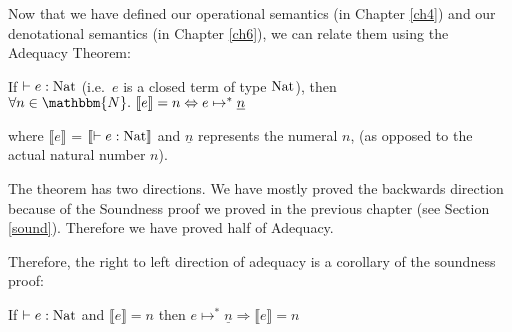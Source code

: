 Now that we have defined our operational semantics (in  Chapter \ref{ch4}) and our denotational semantics (in Chapter \ref{ch6}), we can relate them using the Adequacy Theorem: 

\vspace{1cm}
\begin{thm}\label{adeq}
If $\vdash e : \operatorname{Nat}$ (i.e.\ $e$ is a closed term of type $\operatorname{Nat}$), then $\forall n \in \mathbbm{N}. \ \llbracket e \rrbracket = n \Leftrightarrow e \mapsto^* \underline{n}$
\end{thm}

\vspace{0.5cm}

where $\llbracket e \rrbracket$ = $\llbracket \vdash e : \operatorname{Nat} \rrbracket$ and $\underline{n}$ represents the numeral $n$, (as opposed to the actual natural number $n$).

\vspace{0.5cm}


The theorem has two directions. We have mostly proved the backwards direction because of the Soundness proof we proved in the previous chapter (see Section \ref{sound}). Therefore we have proved half of Adequacy.

Therefore, the right to left direction of adequacy is a corollary of the soundness proof:

\vspace{0.5cm}

\begin{cor}
If $\vdash e : \operatorname{Nat}$ and $\llbracket e \rrbracket = n$ then $e \mapsto^* \underline{n} \Rightarrow \llbracket e \rrbracket = n$
\end{cor}


